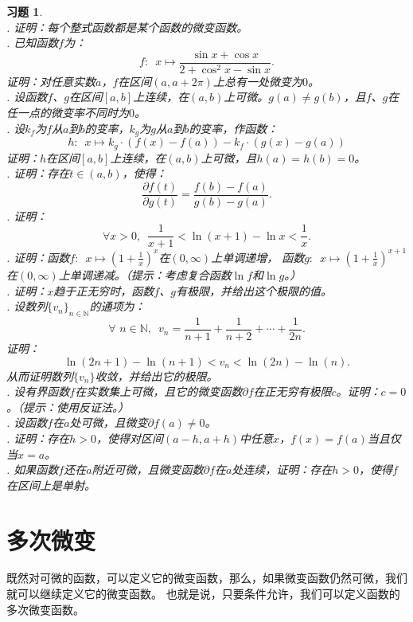 \documentclass[12pt,UTF8]{ctexbook}
\newtheorem{xt}{习题}[section]
\begin{document}
\begin{xt}
    \mbox{} \\
    . 证明：每个整式函数都是某个函数的微变函数。\\
    . 已知函数$f$为：
    $$ f: \,\,\, x\mapsto \frac{\sin{x} + \cos{x}}{2 + \cos^2{x} - \sin{x}}.$$
    \indent 证明：对任意实数$a$，$f$在区间$(a, a + 2\pi)$上总有一处微变为$0$。\\
    . 设函数$f$、$g$在区间$[a, b]$上连续，在$(a, b)$上可微。$g(a) \neq g(b)$，且$f$、$g$在任一点的微变率不同时为$0$。\\
    . 设$k_f$为$f$从$a$到$b$的变率，$k_g$为$g$从$a$到$b$的变率，作函数：
    $$ h : \,\,\, x \mapsto k_g \cdot (f(x) - f(a)) - k_f \cdot (g(x) - g(a))$$
    \indent 证明：$h$在区间$[a, b]$上连续，在$(a, b)$上可微，且$h(a) = h(b) = 0$。\\
    . 证明：存在$t\in(a, b)$，使得：
    $$ \frac{\partial f (t)}{\partial g (t)} = \frac{f(b) - f(a)}{g(b) - g(a)}.$$
    . 证明：
    $$ \forall x > 0, \,\,\, \frac{1}{x+1} < \ln{(x+1)} - \ln{x} < \frac{1}{x}.$$
    . 证明：函数$f: \,\,\,x \mapsto \left(1 + \frac{1}{x}\right)^x$在$(0,\infty)$上单调递增，
    函数$g: \,\,\,x \mapsto \left(1 + \frac{1}{x}\right)^{x+1}$在$(0,\infty)$上单调递减。（提示：考虑复合函数$\ln{f}$和$\ln{g}$。）\\
    . 证明：$x$趋于正无穷时，函数$f$、$g$有极限，并给出这个极限的值。\\
    . 设数列$\{v_n\}_{n\in\mathbb{N}}$的通项为：
    $$ \forall \,\, n\in\mathbb{N},\,\,\, v_n = \frac{1}{n+1} + \frac{1}{n+2} + \cdots + \frac{1}{2n}. $$
    证明：
    $$ \ln{(2n + 1)} - \ln{(n + 1)}  < v_n < \ln{(2n)} - \ln{(n)}. $$
    从而证明数列$\{v_n\}$收敛，并给出它的极限。\\
    . 设有界函数$f$在实数集上可微，且它的微变函数$\partial f$在正无穷有极限$c$。证明：$c = 0$。（提示：使用反证法。）\\
    . 设函数$f$在$a$处可微，且微变$\partial f(a) \neq 0$。\\
    . 证明：存在$h>0$，使得对区间$(a-h,a+h)$中任意$x$，$f(x) = f(a)$当且仅当$x = a$。\\
    . 如果函数$f$还在$a$附近可微，且微变函数$\partial f$在$a$处连续，证明：存在$h>0$，使得$f$在区间上是单射。

\end{xt}

\section{多次微变}
既然对可微的函数，可以定义它的微变函数，那么，如果微变函数仍然可微，我们就可以继续定义它的微变函数。
也就是说，只要条件允许，我们可以定义函数的多次微变函数。
\end{document}
